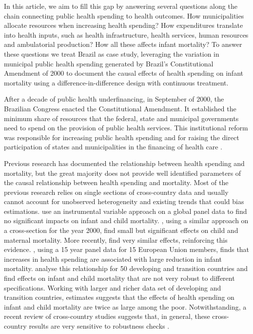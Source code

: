 In this article, we aim to fill this gap by answering several questions along the chain connecting public health spending to health outcomes. How municipalities allocate resources when increasing health spending? How expenditures translate into health inputs, such as health infrastructure, health services, human resources and ambulatorial production? How all these affects infant mortality? To answer these questions we treat Brazil as case study, leveraging the variation in municipal public health spending generated by Brazil's  Constitutional Amendment of 2000 to document the causal effects of health spending on infant mortality using a difference-in-difference design with continuous treatment.

After a decade of public health underfinancing, in September of 2000, the Brazilian Congress enacted the  Constitutional Amendment. It established the minimum share of resources that the federal, state and municipal governments need to spend on the provision of public health services. This institutional reform was responsible for increasing public health spending and for raising the direct participation of states and municipalities in the financing of health care \citep{Piola2013}.

Previous research has documented the relationship between health spending and mortality, but the great majority does not provide well identified parameters of the causal relationship between health spending and mortality. Most of the previous research relies on single sections of cross-country data and usually cannot account for unobserved heterogeneity and existing trends that could bias estimations. \cite{filmer1999} use an instrumental variable approach on a global panel data to find no significant impacts on infant and child mortality. \cite{bokhari2007}, using a similar approach on a cross-section for the year 2000, find small but significant effects on child and maternal mortality. More recently, \cite{moreno2015} find very similar effects, reinforcing this evidence. \cite{nixon2006}, using a 15 year panel data for 15 European Union members, finds that increases in health spending are associated with large reduction in infant mortality. \cite{gupta2002effectiveness} analyse this relationship for 50 developing and transition countries and find effects on infant and child mortality that are not very robust to different specifications. Working with larger and richer data set of developing and transition countries, \cite{Gupta2003} estimates suggests that the  effects of health spending on infant and child mortality are twice as large among the poor. Notwithstanding, a recent review of cross-country studies suggests that, in general, these cross-country results are very sensitive to robustness checks \citep{Nakamura2020}.

